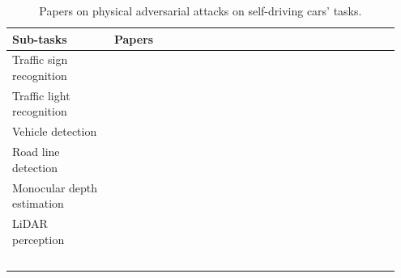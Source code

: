 \documentclass[a4paper]{article}
\begin{document}
\begin{longtable}{p{0.25\linewidth} p{0.7\linewidth}}
  \midrule \raggedright\textbf{Sub-tasks} & \textbf{Papers} \\
  \midrule \raggedright{Traffic sign recognition} & {\cite{lu2017adversarial} \newline~\cite{evtimov2017robust} \newline~\cite{song2018physical} \newline~\cite{sitawarin2018rogue} \newline~\cite{benz2020double} \newline~\cite{duan2020adversarial} \newline~\cite{bai2021inconspicuous} \newline~\cite{lovisotto2021slap} \newline~\cite{zhong2022shadows}}\\
  \midrule Traffic light recognition & {\cite{zolfi2021translucent} \newline~\cite{patel2020bait}} \\
  \midrule \raggedright{Vehicle detection} & {\cite{zhang2019camou} \newline~\cite{wu2020physical} \newline~\cite{huang2020universal} \newline~\cite{wang2021dual} \newline~\cite{suryanto2022dta}} \\
  \midrule \raggedright{Road line detection} & {\cite{boloor2020attacking} \newline~\cite{sato2021dirty}} \\
  \midrule \raggedright{Monocular depth estimation} & {\cite{yamanaka2020adversarial} \newline~\cite{cheng2022physical}} \\
  \midrule \raggedright{LiDAR perception} & {\cite{sun2020towards} \newline~\cite{tu2020physically} \newline~\cite{abdelfattah2021towards}} \\
  \midrule
  \caption{Papers on physical adversarial attacks on self-driving cars' tasks.}~\label{tab:adv-attacks}
\end{longtable}
\end{document}
